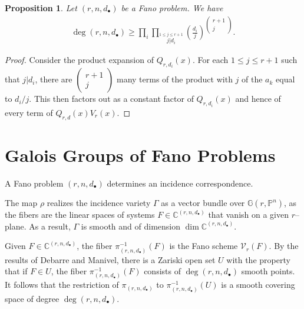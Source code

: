 \documentclass[12pt]{amsart}
\newtheorem{proposition}[theorem]{Proposition}
\theoremstyle{definition}
\newcommand{\gr}{\mathbb{G}}
\begin{document}
\begin{proposition}
Let $(r,n,d_\bullet)$ be a Fano problem. We have
\begin{align*}
\deg(r,n,d_\bullet) \ge \prod_i \prod_{\stackrel{1\le j\le r+1}{j|d_i}} \left(\frac{d_i}{j}\right)^{\left(\begin{smallmatrix}r+1\\j\end{smallmatrix}\right)}.
\end{align*}
\end{proposition}
\begin{proof}
Consider the product expansion of $Q_{r,d_i}(x)$. For each $1\le j\le r+1$ such that $j|d_i$, there are $\left(\begin{smallmatrix}r+1\\j\end{smallmatrix}\right)$ many terms of the product with $j$ of the $a_k$ equal to $d_i/j$. This then factors out as a constant factor of $Q_{r,d_i}(x)$ and hence of every term of $Q_{r,d}(x)V_r(x)$.
\end{proof}



\section{Galois Groups of Fano Problems}
A Fano problem $(r,n,d_\bullet)$ determines an incidence correspondence.
\begin{center}
\end{center}
The map $\rho$ realizes the incidence variety $\Gamma$ as a vector bundle over $\mathbb{G}(r,\mathbb{P}^n)$, as the fibers are the linear spaces of systems $F\in\mathbb{C}^{(r,n,d_\bullet)}$ that vanish on a given $r$--plane. As a result, $\Gamma$ is smooth and of dimension $\dim \mathbb{C}^{(r,n,d_\bullet)}$. 

Given $F\in\mathbb{C}^{(r,n,d_\bullet)}$, the fiber $\pi_{(r,n,d_\bullet)}^{-1}(F)$ is the Fano scheme $\mathcal{V}_r(F)$. By the results of Debarre and Manivel, there is a Zariski open set $U$ with the property that if $F\in U$, the fiber $\pi_{(r,n,d_\bullet)}^{-1}(F)$ consists of $\deg(r,n,d_\bullet)$ smooth points. It follows that the restriction of $\pi_{(r,n,d_\bullet)}$ to $\pi_{(r,n,d_\bullet)}^{-1}(U)$ is a smooth covering space of degree $\deg(r,n,d_\bullet)$. 
\end{document}
